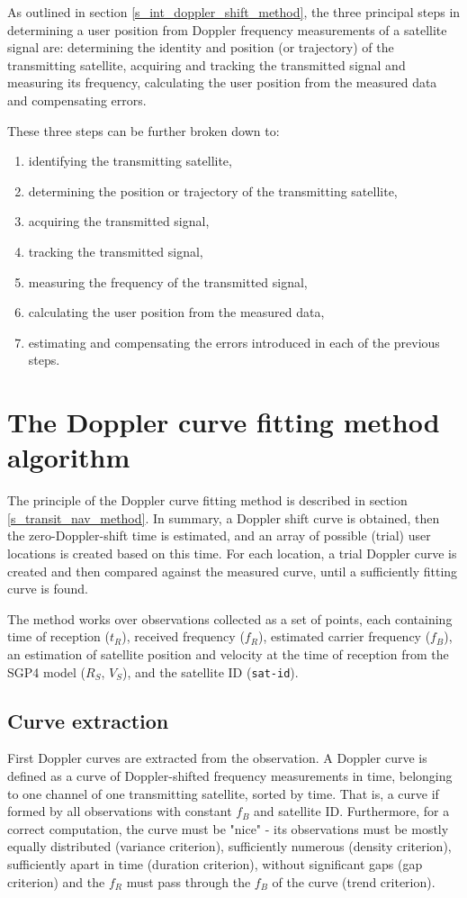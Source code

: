 As outlined in section \ref{s_int_doppler_shift_method}, the three principal steps in determining a user position from Doppler frequency measurements of a satellite signal are: determining the identity and position (or trajectory) of the transmitting satellite, acquiring and tracking the transmitted signal and measuring its frequency, calculating the user position from the measured data and compensating errors. 

These three steps can be further broken down to:
\begin{enumerate}
    \item identifying the transmitting satellite,
    \item determining the position or trajectory of the transmitting satellite,
    \item acquiring the transmitted signal,
    \item tracking the transmitted signal,
    \item measuring the frequency of the transmitted signal,
    \item calculating the user position from the measured data,
    \item estimating and compensating the errors introduced in each of the previous steps.
\end{enumerate}

\section{The Doppler curve fitting method algorithm}
The principle of the Doppler curve fitting method is described in section \ref{s_transit_nav_method}. In summary, a Doppler shift curve is obtained, then the zero-Doppler-shift time is estimated, and an array of possible (trial) user locations is created based on this time. For each location, a trial Doppler curve is created and then compared against the measured curve, until a sufficiently fitting curve is found.

The method works over observations collected as a set of points, each containing time of reception ($t_R$), received frequency ($f_R$), estimated carrier frequency ($f_B$), an estimation of satellite position and velocity at the time of reception from the SGP4 model ($R_S$, $V_S$), and the satellite ID (\texttt{sat-id}).


\subsection{Curve extraction}
First Doppler curves are extracted from the observation. A Doppler curve is defined as a curve of Doppler-shifted frequency measurements in time, belonging to one channel of one transmitting satellite, sorted by time. That is, a curve if formed by all observations with constant $f_B$ and satellite ID. Furthermore, for a correct computation, the curve must be "nice" - its observations must be mostly equally distributed (variance criterion), sufficiently numerous (density criterion), sufficiently apart in time (duration criterion), without significant gaps (gap criterion) and the $f_R$ must pass through the $f_B$ of the curve (trend criterion).

